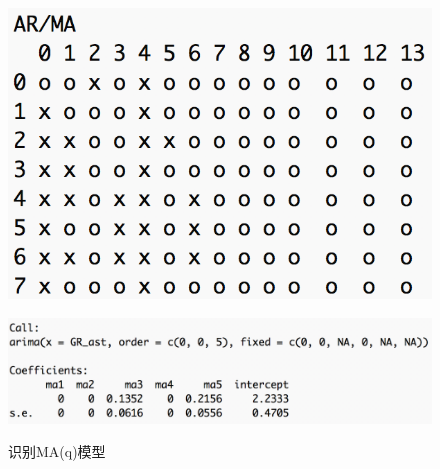 \documentclass[10.5pt,onecolumn,a4paper]{article}%
\begin{document}
\begin{figure}[h!]
\begin{multicols}{2}
        \begin{minipage}[h]{0.5\textwidth} 
            \centering   
            \includegraphics[width=1\textwidth]{pic/eacf(gr_ast)}   
               \label{fig:apegrast:c}   
        \end{minipage}
        \begin{minipage}[h]{0.5\textwidth} 
            \centering   
            \includegraphics[width=1\textwidth]{pic/ma5}   
               \label{fig:apegrast:d}   
        \end{minipage}    
        \caption{识别MA(q)模型} \label{fig:apegrast}
    \end{multicols}
\end{figure}
\end{document}
